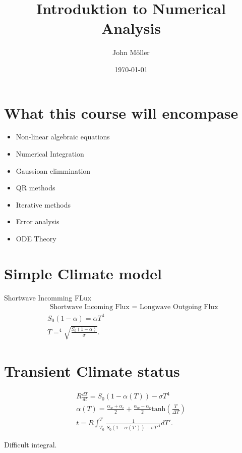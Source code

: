 \documentclass[10pt]{article}
\author{John Möller}
\date{\today}
\title{Introduktion to Numerical Analysis}
\begin{document}
\maketitle

\section{What this course will encompase}
\label{sec:org9205e4c}
\begin{itemize}
\item Non-linear algebraic equations
\item Numerical Integration
\item Gaussioan elimmination
\item QR methods
\item Iterative methods
\item Error analysis
\item ODE Theory
\end{itemize}

\section{Simple Climate model}
\label{sec:org35a5bd9}
Shortwave Incomming FLux
\begin{align*}
 &  \text{ Shortwave Incoming Flux } = \text{ Longwave Outgoing Flux } \\
 &  S_0 (1- \alpha) = \alpha T^{4} \\
 &  T =^{4} \sqrt{\frac{S_0 (1-\alpha)}{\sigma} }
.
\end{align*}

\section{Transient Climate status}
\label{sec:org3369958}

\begin{align*}
R \frac{dT}{dt} = S_0 (1-\alpha(T)) - \sigma T^{4} \\
\alpha(T) = \frac{\alpha _{w} + \alpha _{c}}{2} + \frac{\alpha _{w} - \alpha _{c}}{2} \text{tanh}(\frac{T}{\Delta T}) \\
t = R \int_{ T _{0} }^{ T} \frac{1}{S_0 ( 1- \alpha(T')) - \sigma T '^{4} } dT' 
.
\end{align*}

Difficult integral.
\end{document}
